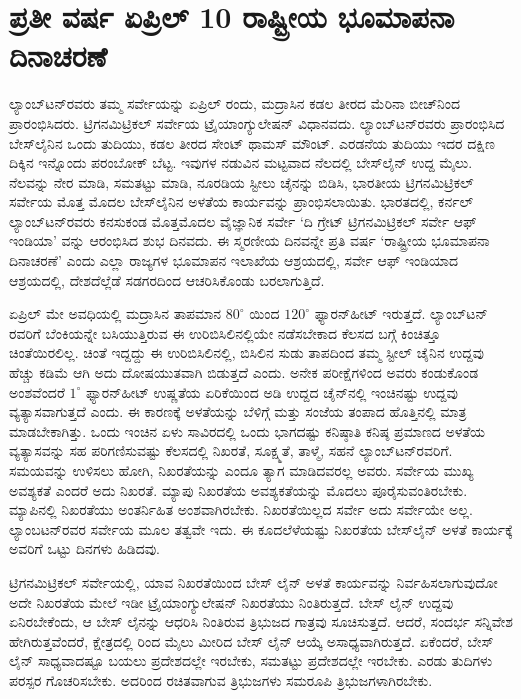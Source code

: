 
\chapter{ಪ್ರತೀ ವರ್ಷ ಏಪ್ರಿಲ್​ 10 ರಾಷ್ಟ್ರೀಯ ಭೂಮಾಪನಾ ದಿನಾಚರಣೆ}

ಲ್ಯಾಂಬ್​ಟನ್​ರವರು ತಮ್ಮ ಸರ್ವೇಯನ್ನು  ಏಪ್ರಿಲ್​  ರಂದು, ಮದ್ರಾಸಿನ ಕಡಲ ತೀರದ ಮೆರಿನಾ ಬೀಚ್​ನಿಂದ ಪ್ರಾರಂಭಿಸಿದರು. ಟ್ರಿಗನಮಿಟ್ರಿಕಲ್​ ಸರ್ವೇಯ ಟ್ರೈಯಾಂಗ್ಯುಲೇಷನ್​ ವಿಧಾನವದು. ಲ್ಯಾಂಬ್​ಟನ್​ರವರು ಪ್ರಾರಂಭಿಸಿದ ಬೇಸ್​ಲೈನಿನ ಒಂದು ತುದಿಯು, ಕಡಲ ತೀರದ ಸೇಂಟ್​ ಥಾಮಸ್​ ಮೌಂಟ್​. ಎರಡನೆಯ ತುದಿಯು ಇದರ ದಕ್ಷಿಣ ದಿಕ್ಕಿನ ಇನ್ನೊಂದು ಪರಂಬೋಕ್​ ಬೆಟ್ಟ. ಇವುಗಳ ನಡುವಿನ ಮಟ್ಟವಾದ ನೆಲದಲ್ಲಿ ಬೇಸ್​ಲೈನ್​ ಉದ್ದ  ಮೈಲು. ನೆಲವನ್ನು ನೇರ ಮಾಡಿ, ಸಮತಟ್ಟು ಮಾಡಿ, ನೂರಡಿಯ ಸ್ಟೀಲು ಚೈನನ್ನು ಬಿಡಿಸಿ, ಭಾರತೀಯ ಟ್ರಿಗನಮಿಟ್ರಿಕಲ್​ ಸರ್ವೇಯ ಮೊತ್ತ ಮೊದಲ ಬೇಸ್​ಲೈನಿನ ಅಳತೆಯ ಕಾರ್ಯವನ್ನು ಪ್ರಾಂಭಿಸಲಾಯಿತು. ಭಾರತದಲ್ಲಿ, ಕರ್ನಲ್​ ಲ್ಯಾಂಬ್​ಟನ್​ರವರು ಕನಸುಕಂಡ ಮೊತ್ತಮೊದಲ ವೈಜ್ಞಾನಿಕ ಸರ್ವೇ ‘ದಿ ಗ್ರೇಟ್​ ಟ್ರಿಗನಮಿಟ್ರಿಕಲ್​ ಸರ್ವೇ ಆಫ್​ ಇಂಡಿಯಾ’ ವನ್ನು ಆರಂಭಿಸಿದ ಶುಭ ದಿನವದು. ಈ ಸ್ಮರಣೀಯ ದಿನವನ್ನೇ ಪ್ರತಿ ವರ್ಷ ‘ರಾಷ್ಟ್ರೀಯ ಭೂಮಾಪನಾ ದಿನಾಚರಣೆ’ ಎಂದು ಎಲ್ಲಾ ರಾಜ್ಯಗಳ ಭೂಮಾಪನ ಇಲಾಖೆಯ ಆಶ್ರಯದಲ್ಲಿ, ಸರ್ವೇ ಆಫ್​ ಇಂಡಿಯಾದ ಆಶ್ರಯದಲ್ಲಿ, ದೇಶದೆಲ್ಲೆಡೆ ಸಡಗರದಿಂದ ಆಚರಿಸಿಕೊಂಡು ಬರಲಾಗುತ್ತಿದೆ.

ಏಪ್ರಿಲ್​ ಮೇ ಅವಧಿಯಲ್ಲಿ ಮದ್ರಾಸಿನ ತಾಪಮಾನ $80^\circ$ ಯಿಂದ $120^\circ$ ಫ್ಯಾರನ್​\break ಹೀಟ್​ ಇರುತ್ತದೆ. ಲ್ಯಾಂಬ್​ಟನ್​ರವರಿಗೆ ಬೆಂಕಿಯನ್ನೇ ಬಸಿಯುತ್ತಿರುವ ಈ ಉರಿಬಿಸಿಲಿನಲ್ಲಿಯೇ ನಡೆಸಬೇಕಾದ ಕೆಲಸದ ಬಗ್ಗೆ ಕಿಂಚಿತ್ತೂ ಚಿಂತೆಯಿರಲಿಲ್ಲ. ಚಿಂತೆ ಇದ್ದದ್ದು ಈ ಉರಿಬಿಸಿಲಿನಲ್ಲಿ, ಬಿಸಿಲಿನ ಸುಡು ತಾಪದಿಂದ ತಮ್ಮ ಸ್ಟೀಲ್​ ಚೈನಿನ ಉದ್ದವು ಹೆಚ್ಚು ಕಡಿಮೆ ಆಗಿ ಅದು ದೋಷಯುತವಾಗಿ ಬಿಡುತ್ತದೆ ಎಂದು. ಅನೇಕ ಪರೀಕ್ಷೆಗಳಿಂದ ಅವರು ಕಂಡುಕೊಂಡ ಅಂಶವೆಂದರೆ $1^\circ$ ಫ್ಯಾರನ್​ಹೀಟ್​ ಉಷ್ಣತೆಯ ಏರಿಕೆಯಿಂದ  ಅಡಿ ಉದ್ದದ ಚೈನ್​ನಲ್ಲಿ  ಇಂಚಿನಷ್ಟು ಉದ್ದವು ವ್ಯತ್ಯಾಸವಾಗುತ್ತದೆ ಎಂದು. ಈ ಕಾರಣಕ್ಕೆ ಅಳತೆಯನ್ನು ಬೆಳಿಗ್ಗೆ ಮತ್ತು ಸಂಜೆಯ ತಂಪಾದ ಹೊತ್ತಿನಲ್ಲಿ ಮಾತ್ರ ಮಾಡಬೇಕಾಗಿತ್ತು. ಒಂದು ಇಂಚಿನ ಏಳು ಸಾವಿರದಲ್ಲಿ ಒಂದು ಭಾಗದಷ್ಟು ಕನಿಷ್ಠಾತಿ ಕನಿಷ್ಠ ಪ್ರಮಾಣದ ಅಳತೆಯ ವ್ಯತ್ಯಾಸವನ್ನು ಸಹ ಪರಿಗಣಿಸುವಷ್ಟು ಕೆಲಸದಲ್ಲಿ ನಿಖರತೆ, ಸೂಕ್ಷ್ಮತೆ, ತಾಳ್ಮೆ, ಸಹನೆ ಲ್ಯಾಂಬ್​ಟನ್​ರವರಿಗೆ. ಸಮಯವನ್ನು ಉಳಿಸಲು ಹೋಗಿ, ನಿಖರತೆಯನ್ನು ಎಂದೂ ತ್ಯಾಗ ಮಾಡಿದವರಲ್ಲ ಅವರು. ಸರ್ವೇಯ ಮುಖ್ಯ ಅವಶ್ಯಕತೆ ಎಂದರೆ ಅದು ನಿಖರತೆ. ಮ್ಯಾಪು ನಿಖರತೆಯ ಅವಶ್ಯಕತೆಯನ್ನು ಮೊದಲು ಪೂರೈಸುವಂತಿರಬೇಕು. ಮ್ಯಾಪಿನಲ್ಲಿ ನಿಖರತೆಯು ಅಂತರ್ನಿಹಿತ ಅಂಶವಾಗಿರಬೇಕು. ನಿಖರತೆಯಿಲ್ಲದ ಸರ್ವೇ ಅದು ಸರ್ವೇಯೇ ಅಲ್ಲ. ಲ್ಯಾಂಬಟನ್​ರವರ ಸರ್ವೇಯ ಮೂಲ ತತ್ವವೇ ಇದು. ಈ ಕೂದಲೆಳೆಯಷ್ಟು ನಿಖರತೆಯ ಬೇಸ್​ಲೈನ್​ ಅಳತೆ ಕಾರ್ಯಕ್ಕೆ ಅವರಿಗೆ ಒಟ್ಟು  ದಿನಗಳು ಹಿಡಿದವು.

ಟ್ರಿಗನಮಿಟ್ರಿಕಲ್​ ಸರ್ವೇಯಲ್ಲಿ, ಯಾವ ನಿಖರತೆಯಿಂದ ಬೇಸ್​ ಲೈನ್​ ಅಳತೆ ಕಾರ್ಯವನ್ನು ನಿರ್ವಹಿಸಲಾಗುವುದೋ ಅದೇ ನಿಖರತೆಯ ಮೇಲೆ ಇಡೀ ಟ್ರೈಯಾಂಗ್ಯುಲೇಷನ್​ ನಿಖರತೆಯು ನಿಂತಿರುತ್ತದೆ. ಬೇಸ್​ ಲೈನ್​ ಉದ್ದವು ಏನಿರಬೇಕೆಂದು, ಆ ಬೇಸ್​ ಲೈನನ್ನು ಆಧರಿಸಿ ನಿಂತಿರುವ ತ್ರಿಭುಜದ ಗಾತ್ರವು ಸೂಚಿಸುತ್ತದೆ. ಆದರೆ, ಸಂದರ್ಭ ಸನ್ನಿವೇಶ ಹೇಗಿರುತ್ತವೆಂದರೆ, ಕ್ಷೇತ್ರದಲ್ಲಿ  ರಿಂದ  ಮೈಲು ಮೀರಿದ ಬೇಸ್​ ಲೈನ್​ ಆಯ್ಕೆ ಅಸಾಧ್ಯವಾಗಿರುತ್ತದೆ. ಏಕೆಂದರೆ, ಬೇಸ್​ ಲೈನ್​ ಸಾಧ್ಯವಾದಷ್ಟೂ ಬಯಲು ಪ್ರದೇಶದಲ್ಲೇ ಇರಬೇಕು, ಸಮತಟ್ಟು ಪ್ರದೇಶದಲ್ಲೇ ಇರಬೇಕು. ಎರಡು ತುದಿಗಳು ಪರಸ್ಪರ ಗೊಚರಿಸಬೇಕು. ಅದರಿಂದ ರಚಿತವಾಗುವ ತ್ರಿಭುಜಗಳು ಸಮರೂಪಿ ತ್ರಿಭುಜಗಳಾಗಿರಬೇಕು.

